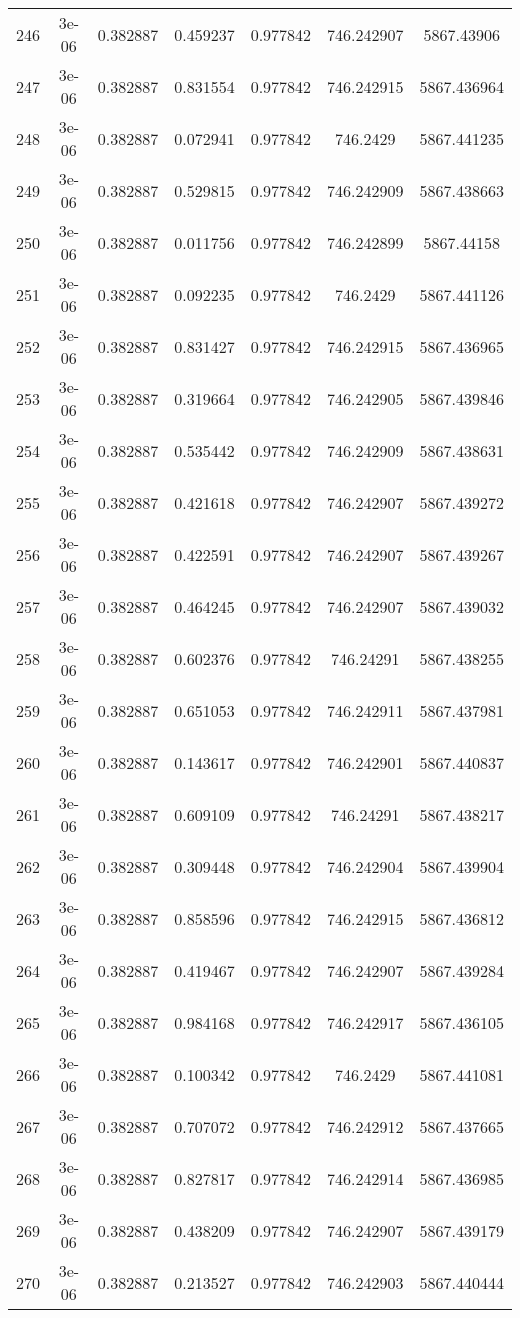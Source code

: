 \begin{table}
\begin{tabular*}{\linewidth}{c|c|c|c|c|c|c}
246 & 3e-06 & 0.382887 & 0.459237 & 0.977842 & 746.242907 & 5867.43906\\
247 & 3e-06 & 0.382887 & 0.831554 & 0.977842 & 746.242915 & 5867.436964\\
248 & 3e-06 & 0.382887 & 0.072941 & 0.977842 & 746.2429 & 5867.441235\\
249 & 3e-06 & 0.382887 & 0.529815 & 0.977842 & 746.242909 & 5867.438663\\
250 & 3e-06 & 0.382887 & 0.011756 & 0.977842 & 746.242899 & 5867.44158\\
251 & 3e-06 & 0.382887 & 0.092235 & 0.977842 & 746.2429 & 5867.441126\\
252 & 3e-06 & 0.382887 & 0.831427 & 0.977842 & 746.242915 & 5867.436965\\
253 & 3e-06 & 0.382887 & 0.319664 & 0.977842 & 746.242905 & 5867.439846\\
254 & 3e-06 & 0.382887 & 0.535442 & 0.977842 & 746.242909 & 5867.438631\\
255 & 3e-06 & 0.382887 & 0.421618 & 0.977842 & 746.242907 & 5867.439272\\
256 & 3e-06 & 0.382887 & 0.422591 & 0.977842 & 746.242907 & 5867.439267\\
257 & 3e-06 & 0.382887 & 0.464245 & 0.977842 & 746.242907 & 5867.439032\\
258 & 3e-06 & 0.382887 & 0.602376 & 0.977842 & 746.24291 & 5867.438255\\
259 & 3e-06 & 0.382887 & 0.651053 & 0.977842 & 746.242911 & 5867.437981\\
260 & 3e-06 & 0.382887 & 0.143617 & 0.977842 & 746.242901 & 5867.440837\\
261 & 3e-06 & 0.382887 & 0.609109 & 0.977842 & 746.24291 & 5867.438217\\
262 & 3e-06 & 0.382887 & 0.309448 & 0.977842 & 746.242904 & 5867.439904\\
263 & 3e-06 & 0.382887 & 0.858596 & 0.977842 & 746.242915 & 5867.436812\\
264 & 3e-06 & 0.382887 & 0.419467 & 0.977842 & 746.242907 & 5867.439284\\
265 & 3e-06 & 0.382887 & 0.984168 & 0.977842 & 746.242917 & 5867.436105\\
266 & 3e-06 & 0.382887 & 0.100342 & 0.977842 & 746.2429 & 5867.441081\\
267 & 3e-06 & 0.382887 & 0.707072 & 0.977842 & 746.242912 & 5867.437665\\
268 & 3e-06 & 0.382887 & 0.827817 & 0.977842 & 746.242914 & 5867.436985\\
269 & 3e-06 & 0.382887 & 0.438209 & 0.977842 & 746.242907 & 5867.439179\\
270 & 3e-06 & 0.382887 & 0.213527 & 0.977842 & 746.242903 & 5867.440444\\
\end{tabular*}
\end{table}
